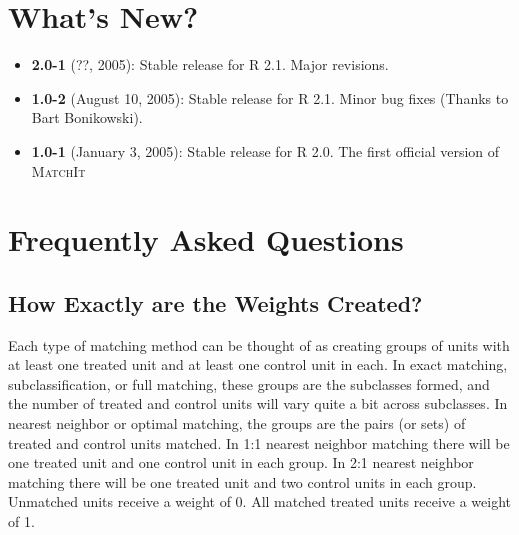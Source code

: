 \documentclass[oneside,letterpaper,titlepage]{article}
\newcommand{\MatchIt}{\textsc{MatchIt}}
\begin{document}

\section{What's New?}

\begin{itemize}
\item \textbf{2.0-1} (??, 2005): Stable release for R 2.1. Major revisions.
\item \textbf{1.0-2} (August 10, 2005): Stable release for R
  2.1. Minor bug fixes (Thanks to Bart Bonikowski).
\item \textbf{1.0-1} (January 3, 2005): Stable release for R 2.0. The
  first official version of \MatchIt
\end{itemize}




\section{Frequently Asked Questions}

%

\subsection{How Exactly are the Weights Created?}
\label{subsec:weights}

Each type of matching method can be thought of as creating groups of
units with at least one treated unit and at least one control unit in
each.  In exact matching, subclassification, or full matching, these
groups are the subclasses formed, and the number of treated and
control units will vary quite a bit across subclasses.  In nearest
neighbor or optimal matching, the groups are the pairs (or sets) of
treated and control units matched.  In 1:1 nearest neighbor matching
there will be one treated unit and one control unit in each group.  In
2:1 nearest neighbor matching there will be one treated unit and two
control units in each group.  Unmatched units receive a weight of 0.
All matched treated units receive a weight of 1.
\end{document}

